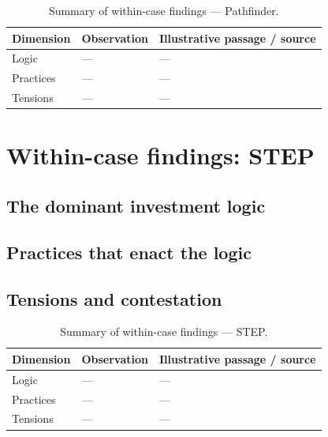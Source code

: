 \begin{table}[H]
\centering
\caption[Pathfinder findings summary]{Summary of within-case findings —
Pathfinder.}
\label{tab:pf-findings}
\begin{tabularx}{\textwidth}{@{} l X X @{}}
\toprule
\textbf{Dimension} & \textbf{Observation} & \textbf{Illustrative passage / source} \\
\midrule
Logic         & --- & --- \\
Practices     & --- & --- \\
Tensions      & --- & --- \\
\bottomrule
\end{tabularx}
\end{table}

\section{Within-case findings: STEP}
\label{sec:res-step}

\subsection{The dominant investment logic}
\label{sec:res-step-logic}

\subsection{Practices that enact the logic}
\label{sec:res-step-practices}

\subsection{Tensions and contestation}
\label{sec:res-step-tensions}

\begin{table}[H]
\centering
\caption[STEP findings summary]{Summary of within-case findings — STEP.}
\label{tab:step-findings}
\begin{tabularx}{\textwidth}{@{} l X X @{}}
\toprule
\textbf{Dimension} & \textbf{Observation} & \textbf{Illustrative passage / source} \\
\midrule
Logic         & --- & --- \\
Practices     & --- & --- \\
Tensions      & --- & --- \\
\bottomrule
\end{tabularx}
\end{table}

